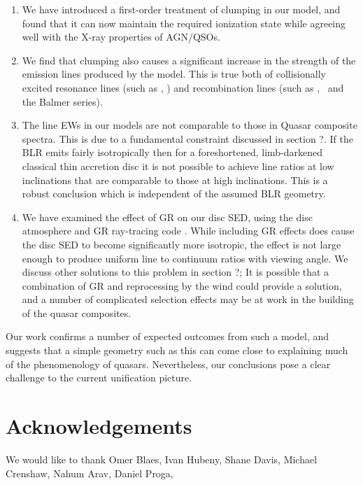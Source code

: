 \documentclass[useAMS,usenatbib]{mn2e_x}
\begin{document}
\begin{enumerate}
\item We have introduced a first-order treatment 
of clumping in our model, and found that it can now maintain
the required ionization state while agreeing well with the X-ray
properties of AGN/QSOs.
\smallskip
\item We find that clumping also causes a significant 
increase in the strength of the  emission
lines produced by the model. This is true both
of collisionally excited resonance lines (such as \civ, \nv)
and recombination lines (such as \la, \ha\ and the Balmer series).
\smallskip
\item The line EWs in our models are not comparable to those in Quasar composite
spectra. This is due to a fundamental constraint discussed in section ?. If the BLR
emits fairly isotropically then for a foreshortened, limb-darkened classical thin accretion disc
it is not possible to achieve line ratios at low inclinations that are comparable to
those at high inclinations. This is a robust conclusion which 
is independent of the assumed BLR geometry. 
\smallskip
\item We have examined the effect of GR on our disc SED, using the disc atmosphere
and GR ray-tracing code \agn. While including GR effects
does cause the disc SED to become significantly more isotropic,
the effect is not large enough to produce uniform line to continuum ratios
with viewing angle. We discuss other solutions to this problem in section ?; 
It is possible that a combination of GR and reprocessing by the wind could provide a 
solution, and a number of complicated selection effects may be at work
in the building of the quasar composites.
\end{enumerate}

Our work confirms a number of expected outcomes from such a model, and suggests 
that a simple geometry such as this can come close to explaining much of the 
phenomenology of quasars. Nevertheless, our conclusions pose a clear challenge 
to the current unification picture.


\section*{Acknowledgements}

We would like to thank Omer Blaes, Ivan Hubeny, Shane Davis, 
Michael Crenshaw, Nahum Arav, Daniel Proga, 




\newpage
\end{document}
